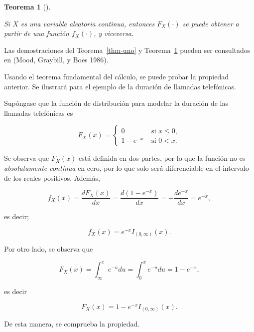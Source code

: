 \documentclass[
  us-letterpaper,
]{scrreprt}
\theoremstyle{plain}
\newtheorem{theorem}{Teorema}[chapter]
\theoremstyle{definition}
\theoremstyle{definition}
\theoremstyle{plain}
\theoremstyle{remark}
\begin{document}
\begin{theorem}[]\protect\hypertarget{thm-dos}{}\label{thm-dos}

Si \(X\) es una variable aleatoria continua, entonces \(F_X(\cdot)\) se
puede obtener a partir de una función \(f_X(\cdot)\), y viceversa.

\end{theorem}

Las demostraciones del Teorema~\ref{thm-uno} y Teorema~\ref{thm-dos}
pueden ser consultados en (Mood, Graybill, y Boes 1986).

\begin{tcolorbox}[enhanced jigsaw, breakable, colbacktitle=quarto-callout-caution-color!10!white, rightrule=.15mm, toptitle=1mm, colback=white, left=2mm, colframe=quarto-callout-caution-color-frame, bottomtitle=1mm, opacitybacktitle=0.6, leftrule=.75mm, arc=.35mm, title={Ejemplo (\textbf{\emph{Duración de una llamada telefónica}})}, coltitle=black, titlerule=0mm, opacityback=0, bottomrule=.15mm, toprule=.15mm]

Usando el teorema fundamental del cálculo, se puede probar la propiedad
anterior. Se ilustrará para el ejemplo de la duración de llamadas
telefónicas.

Supóngase que la función de distribución para modelar la duración de las
llamadas telefónicas es

\[ F_X(x)=\begin{cases}0 & \text{ si } x \le 0,\\ 1-e^{-x} & \text{ si } 0< x.\end{cases} \]

Se observa que \(F_X(x)\) está definida en dos partes, por lo que la
función no es \emph{absolutamente continua} en cero, por lo que solo
será diferenciable en el intervalo de los reales positivos. Además,

\[ f_X(x)=\frac{dF_X(x)}{dx}=\frac{d (1-e^{-x})}{dx}=-\frac{d e^{-x}}{dx}=e^{-x}, \]

es decir;

\[ f_X(x)=e^{-x}I_{(0,\infty)}(x). \]

Por otro lado, se observa que

\[ F_X(x)= \int_{\infty}^x e^{-u}du=\int_0^x e^{-u}du=1-e^{-x}, \]

es decir

\[ F_X(x)=1-e^{-x} I_{(0,\infty)}(x) .\]

De esta manera, se comprueba la propiedad.

\end{tcolorbox}
\end{document}
